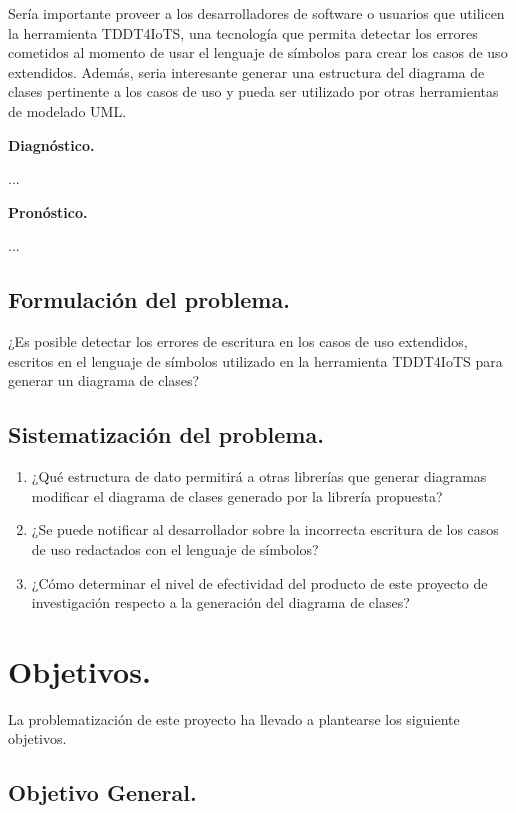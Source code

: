 Sería importante proveer a los desarrolladores de software o usuarios que utilicen la herramienta TDDT4IoTS, una tecnología que permita detectar los errores cometidos al momento de usar el lenguaje de símbolos para crear los casos de uso extendidos. Además, seria interesante generar una estructura del diagrama de clases pertinente a los casos de uso y pueda ser utilizado por otras herramientas de modelado UML.

\textbf{Diagnóstico.}

...

\textbf{Pronóstico.}

...

\subsection{Formulación del problema.}

¿Es posible detectar los errores de escritura en los casos de uso extendidos, escritos en el lenguaje de símbolos utilizado en la herramienta TDDT4IoTS para generar un diagrama de clases?

\subsection{Sistematización del problema.}

\begin{enumerate}
	\item ¿Qué estructura de dato permitirá a otras librerías que generar diagramas modificar el diagrama de clases generado por la librería propuesta?
	
	\item ¿Se puede notificar al desarrollador sobre la incorrecta escritura de los casos de uso redactados con el lenguaje de símbolos?
	
	\item ¿Cómo determinar el nivel de efectividad del producto de este proyecto de investigación respecto a la generación del diagrama de clases?
\end{enumerate}

\section{Objetivos.}

La problematización de este proyecto ha llevado a plantearse los siguiente objetivos.

\subsection{Objetivo General.}

